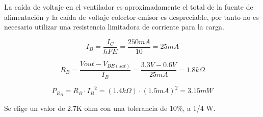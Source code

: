     \begin{center}
        La caída de voltaje en el ventilador es aproximadamente el total de la fuente de alimentación y la caída de voltaje colector-emisor es despreciable, por tanto no es necesario utilizar una resistencia limitadora de corriente para la carga.\\
    \end{center}
    
    \begin{equation}
        I_{B}   
        =   \frac { I_{C} } { hFE }
        =   \frac { 250mA } { 10 }
        =   25mA
    \end{equation}

    \begin{equation}
        R_{B}   
        =   \frac { Vout - V_{BE(sat)} } { I_{B} }
        =   \frac { 3.3V - 0.6V } { 25 mA }
        =   1.8k\Omega
    \end{equation}
    
    \begin{equation}
        P_{R_{B}}
        =   R_{B} \cdot {I_{B}}^2
        =   (1.4k\Omega) \cdot (1.5mA)^2
        =   3.15mW
    \end{equation}
    
    \begin{center}
        Se elige un valor de 2.7K ohm con una tolerancia de 10\%, a 1/4 W.\\
    \end{center}
    